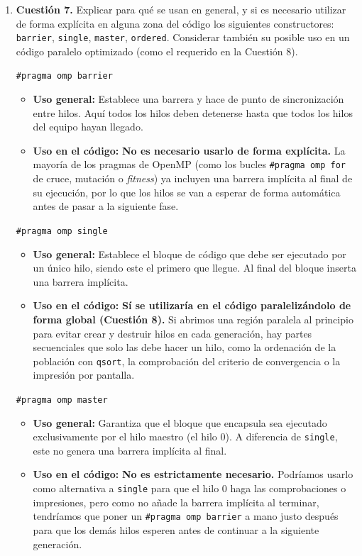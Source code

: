 \documentclass[12pt]{article}
\begin{document}
\begin{enumerate}
\newpage



\item \textbf{Cuestión 7.} Explicar para qué se usan en general, y si es necesario utilizar de forma explícita en alguna zona del código los siguientes constructores: \texttt{barrier}, \texttt{single}, \texttt{master}, \texttt{ordered}. Considerar también su posible uso en un código paralelo optimizado (como el requerido en la Cuestión 8).

\texttt{\#pragma omp barrier}
\begin{itemize}
    \item \textbf{Uso general:} Establece una barrera y hace de punto de sincronización entre hilos. Aquí todos los hilos deben detenerse hasta que todos los hilos del equipo hayan llegado.
    \item \textbf{Uso en el código:} \textbf{No es necesario usarlo de forma explícita.} La mayoría de los pragmas de OpenMP (como los bucles \texttt{\#pragma omp for} de cruce, mutación o \textit{fitness}) ya incluyen una barrera implícita al final de su ejecución, por lo que los hilos se van a esperar de forma automática antes de pasar a la siguiente fase.
\end{itemize}

 \texttt{\#pragma omp single}
\begin{itemize}
    \item \textbf{Uso general:} Establece el bloque de código que debe ser ejecutado por un único hilo, siendo este el primero que llegue. Al final del bloque inserta una barrera implícita.
    \item \textbf{Uso en el código:} \textbf{Sí se utilizaría en el código paralelizándolo de forma global (Cuestión 8).} Si abrimos una región paralela al principio para evitar crear y destruir hilos en cada generación, hay partes secuenciales que solo las debe hacer un hilo, como la ordenación de la población con \texttt{qsort}, la comprobación del criterio de convergencia o la impresión por pantalla.
\end{itemize}

 \texttt{\#pragma omp master}
\begin{itemize}
    \item \textbf{Uso general:} Garantiza que el bloque que encapsula sea ejecutado exclusivamente por el hilo maestro (el hilo 0). A diferencia de \texttt{single}, este no genera una barrera implícita al final.
    \item \textbf{Uso en el código:} \textbf{No es estrictamente necesario.} Podríamos usarlo como alternativa a \texttt{single} para que el hilo 0 haga las comprobaciones o impresiones, pero como no añade la barrera implícita al terminar, tendríamos que poner un \texttt{\#pragma omp barrier} a mano justo después para que los demás hilos esperen antes de continuar a la siguiente generación.
\end{itemize}


\end{enumerate}
\end{document}
